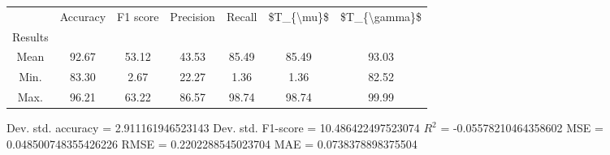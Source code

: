 \begin{tabular}{|c|c|c|c|c|c|c|}
\toprule
{} &  Accuracy &  F1 score &  Precision &  Recall &  \$T\_\{\textbackslash mu\}\$ &  \$T\_\{\textbackslash gamma\}\$ \\
Results &           &           &            &         &            &               \\
\hline
Mean    &     92.67 &     53.12 &      43.53 &   85.49 &      85.49 &         93.03 \\
Min.    &     83.30 &      2.67 &      22.27 &    1.36 &       1.36 &         82.52 \\
Max.    &     96.21 &     63.22 &      86.57 &   98.74 &      98.74 &         99.99 \\
\bottomrule
\end{tabular}

 Dev. std. accuracy = 2.911161946523143
 Dev. std. F1-score = 10.486422497523074
 $R^2$ = -0.05578210464358602
 MSE = 0.048500748355426226
 RMSE = 0.2202288545023704
 MAE = 0.0738378898375504